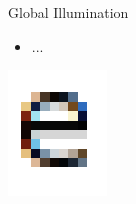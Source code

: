 \documentclass{lug}
\newcommand{\splitslide}[4]{
    \noindent
    \begin{minipage}{#1 \textwidth - #2 }
        #3
    \end{minipage}%
    \hspace{ \dimexpr #2 * 2 \relax }%
    \begin{minipage}{\textwidth - #1 \textwidth - #2 }
        #4
    \end{minipage}
}
\begin{document}
\begin{frame}{Global Illumination}
    \splitslide{0.65}{.7em}{
        \small
        \begin{itemize}
            \item ...
        \end{itemize}
    }{
        \includegraphics[width=\textwidth]{graphics/subpixel_e}
    }
\end{frame}
\end{document}
